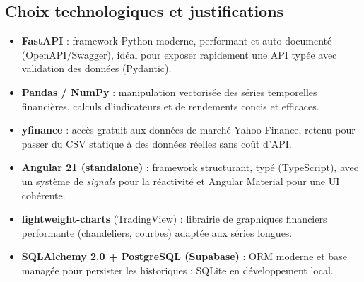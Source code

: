 \documentclass[11pt,a4paper]{article}
\begin{document}
\subsection{Choix technologiques et justifications}
\begin{itemize}[leftmargin=1.4em]
  \item \textbf{FastAPI} : framework Python moderne, performant et auto-documenté
        (OpenAPI/Swagger), idéal pour exposer rapidement une API typée avec
        validation des données (Pydantic).
  \item \textbf{Pandas / NumPy} : manipulation vectorisée des séries temporelles
        financières, calculs d'indicateurs et de rendements concis et efficaces.
  \item \textbf{yfinance} : accès gratuit aux données de marché Yahoo Finance,
        retenu pour passer du CSV statique à des données réelles sans coût d'API.
  \item \textbf{Angular 21 (standalone)} : framework structurant, typé
        (TypeScript), avec un système de \emph{signals} pour la réactivité et
        Angular Material pour une UI cohérente.
  \item \textbf{lightweight-charts} (TradingView) : librairie de graphiques
        financiers performante (chandeliers, courbes) adaptée aux séries longues.
  \item \textbf{SQLAlchemy 2.0 + PostgreSQL (Supabase)} : ORM moderne et base
        managée pour persister les historiques ; SQLite en développement local.
\end{itemize}
\end{document}
